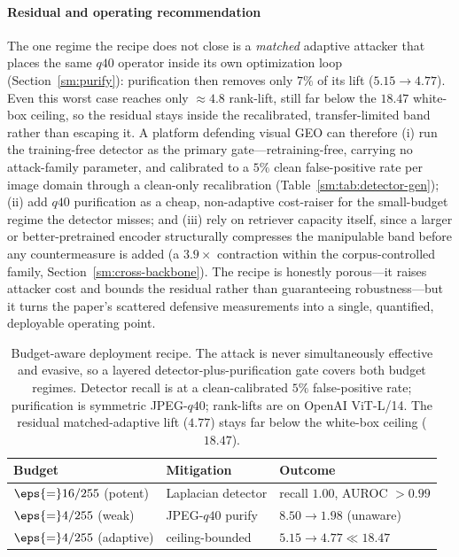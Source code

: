 \paragraph{Residual and operating recommendation} The one regime the recipe does
not close is a \emph{matched} adaptive attacker that places the same $q40$ operator
inside its own optimization loop (Section~\ref{sm:purify}): purification then removes
only $7\%$ of its lift ($5.15 \to 4.77$). Even this worst case reaches only
$\approx 4.8$ rank-lift, still far below the $18.47$ white-box ceiling, so the
residual stays inside the recalibrated, transfer-limited band rather than escaping
it. A platform defending visual GEO can therefore (i) run the training-free detector
as the primary gate---retraining-free, carrying no attack-family parameter, and
calibrated to a $5\%$ clean false-positive rate per image domain through a clean-only
recalibration (Table~\ref{sm:tab:detector-gen}); (ii) add $q40$ purification as a
cheap, non-adaptive cost-raiser for the small-budget regime the detector misses; and
(iii) rely on retriever capacity itself, since a larger or better-pretrained encoder
structurally compresses the manipulable band before any countermeasure is added
(a $3.9\times$ contraction within the corpus-controlled family,
Section~\ref{sm:cross-backbone}). The recipe is honestly porous---it raises attacker
cost and bounds the residual rather than guaranteeing robustness---but it turns the
paper's scattered defensive measurements into a single, quantified, deployable
operating point.

\begin{table}[t]
\centering
\caption{Budget-aware deployment recipe. The attack is never simultaneously
effective and evasive, so a layered detector-plus-purification gate covers both
budget regimes. Detector recall is at a clean-calibrated $5\%$ false-positive rate;
purification is symmetric JPEG-$q40$; rank-lifts are on OpenAI ViT-L/14. The residual
matched-adaptive lift ($4.77$) stays far below the white-box ceiling ($18.47$).}
\label{sm:tab:recipe}
\footnotesize
\setlength{\tabcolsep}{3pt}
\begin{tabular}{lll}
\toprule
Budget & Mitigation & Outcome \\
\midrule
$\eps{=}16/255$ (potent)   & Laplacian detector & recall $1.00$, AUROC ${>}0.99$ \\
$\eps{=}4/255$ (weak)      & JPEG-$q40$ purify  & $8.50{\to}1.98$ (unaware) \\
$\eps{=}4/255$ (adaptive)  & ceiling-bounded    & $5.15{\to}4.77 \ll 18.47$ \\
\bottomrule
\end{tabular}
\end{table}

